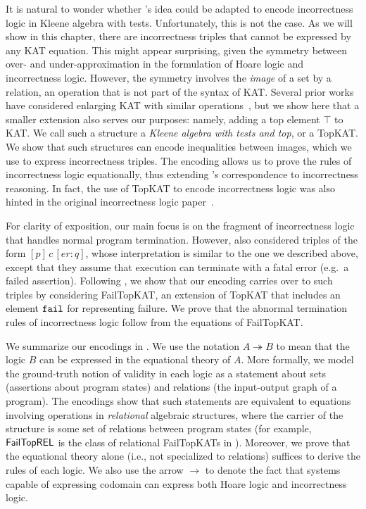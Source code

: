 It is natural to wonder whether \citeauthor{Kozen_2000}'s idea could be
adapted to encode incorrectness logic in Kleene algebra with tests.
Unfortunately, this is not the case. As we will show in this chapter, there are
incorrectness triples that cannot be expressed by any KAT equation.  This might
appear surprising, given the symmetry between over- and under-approximation in
the formulation of Hoare logic and incorrectness logic.  However, the symmetry
involves the \emph{image} of a set by a relation, an operation that is not part
of the syntax of KAT\@.  Several prior works have considered enlarging KAT with
similar
operations~\cite{Desharnais_Möller_Struth_2004,Fahrenberg_Johansen_Struth_Ziemiánski_2021,Desharnais_Möller_Struth_2006},
but we show here that a smaller extension also serves our purposes: namely,
adding a top element \(\top\) to KAT\@.   We call such a structure a \emph{Kleene
  algebra with tests and top}, or a TopKAT\@.  We show that such structures can
encode inequalities between images, which we use to express incorrectness
triples.  The encoding allows us to prove the rules of incorrectness logic
equationally, thus extending \citeauthor{Kozen_2000}'s correspondence to
incorrectness reasoning. In fact, the use of TopKAT to encode incorrectness logic was also hinted in the original incorrectness logic paper~\cite{OHearn_2020}.

For clarity of exposition, our main focus is on the fragment of incorrectness
logic that handles normal program termination.  However,
\citet{OHearn_2020} also considered triples of the form
\([p]\, c\, [er: q]\), whose interpretation is similar to the one we described
above, except that they assume that execution can terminate with a fatal error
(e.g.\ a failed assertion).  Following \citet{Mamouras_2017}, we show
that our encoding carries over to such triples by considering FailTopKAT, an
extension of TopKAT that includes an element \(\mathtt{fail}\) for representing failure.
We prove that the abnormal termination rules of incorrectness logic follow from
the equations of FailTopKAT\@.

We summarize our encodings in .  We
use the notation \(A ↠ B\) to mean that the logic \(B\) can be
expressed in the equational theory of \(A\).  More formally, we model the
ground-truth notion of validity in each logic as a statement about sets
(assertions about program states) and relations (the input-output graph of a
program).  The encodings show that such statements are equivalent to equations
involving operations in \emph{relational} algebraic structures, where the
carrier of the structure is some set of relations between program states (for
example, \(\mathsf{FailTopREL}\) is the class of relational FailTopKATs in
).  Moreover, we prove that the equational
theory alone (i.e., not specialized to relations) suffices to derive the rules
of each logic.  We also use the arrow \(\to\) to denote the fact that 
systems capable of expressing codomain can express both Hoare logic and incorrectness logic.

